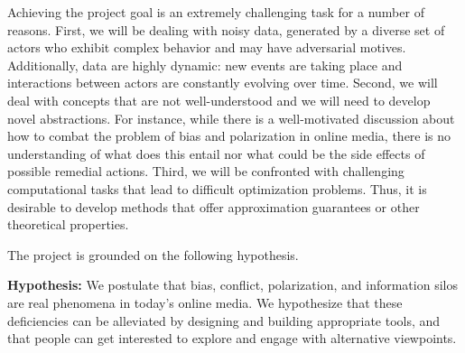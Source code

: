 \documentclass[a4paper,11pt]{article}
\begin{document}
Achieving the project goal is an extremely challenging task for a number of reasons. 
First, we will be dealing with noisy data, 
generated by a diverse set of actors
who exhibit complex behavior and may have adversarial motives.
Additionally, data are highly dynamic:
new events are taking place and inter\-actions between actors 
are constantly evolving over time. 
Second, we will deal with concepts that are not well-understood 
and we will need to develop novel abstractions. %
For instance, 
while there is a well-motivated discussion 
about how to combat the problem of bias and polarization in online media, 
there is no understanding of what does this entail %
nor what could be the side effects of possible remedial actions.
Third, we will be confronted with challenging computational tasks 
that lead to difficult optimization problems. 
Thus, it is desirable to develop methods 
that offer approximation guarantees or other theoretical properties. 

\iffalse
\spara{Methodological approach.}
We will pursue the project goal by
following a methodology that aims to tackle the challenges outlined above.
(1)~We will develop abstractions that capture the semantics of the application domain
and we will provide formal problem definitions that capture our objectives.
(2)~We will develop and work with theoretical frameworks that capture the noise and complexity 
of real-world data. 
(3)~We will develop scalable algorithms with theoretical guarantees on the solution quality. 
\fi

%
The project is grounded on the following hypothesis. 

\medskip
\noindent
\hspace{-3mm}\colorbox{verylightmagenta}{
\begin{minipage}{\textwidth}
{\bf Hypothesis:} 
We postulate that bias, conflict, polarization, and information silos
are real phenomena in today's online media. 
We hypothesize that these deficiencies can be alleviated by designing and building appropriate tools, 
and that people can get interested to explore and engage with alternative viewpoints. 
\end{minipage}}
\end{document}
